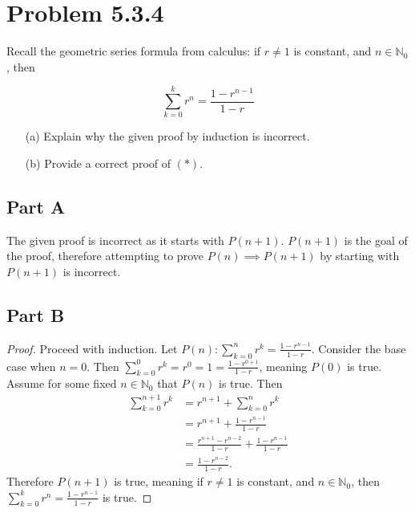 \documentclass[12pt]{extarticle}
\begin{document}
\section*{Problem 5.3.4}

Recall the geometric series formula from calculus: if $r \neq 1$ is constant, and $n \in \mathbb{N}_0$, then

\begin{equation*}
	\sum_{k=0}^k r^n = \frac{1-r^{n-1}}{1 - r} \tag{$*$}
\end{equation*}

\begin{enumerate}
	\item[(a)] Explain why the given proof by induction is incorrect.	
	\item[(b)] Provide a correct proof of $(*)$.
\end{enumerate}

\subsection*{Part A}

The given proof is incorrect as it starts with $P(n+1)$. $P(n+1)$ is the goal of the proof, therefore attempting to prove $P(n) \implies P(n+1)$ by starting with $P(n+1)$ is incorrect.

\subsection*{Part B}

\begin{proof}
	Proceed with induction. Let $P(n): \displaystyle\sum_{k=0}^n r^k = \frac{1-r^{n-1}}{1 - r}$. Consider the base case when $n = 0$. Then $\displaystyle\sum_{k=0}^0 r^k = r^0 = 1 = \frac{1 - r^{0+1}}{1 - r}$, meaning $P(0)$ is true. Assume for some fixed $n \in \mathbb{N}_0$ that $P(n)$ is true. Then
	\begin{align*}
		\sum_{k=0}^{n+1} r^k &= r^{n+1} + \sum_{k=0}^{n} r^k \\
												 &= r^{n+1} + \frac{1-r^{n-1}}{1-r} \\
												 &= \frac{r^{n+1} - r^{n-2}}{1-r} + \frac{1-r^{n-1}}{1-r} \\
												 &= \frac{1 - r^{n-2}}{1-r}
	.\end{align*}
	Therefore $P(n+1)$ is true, meaning if $r \neq 1$ is constant, and $n \in \mathbb{N}_0$, then $\displaystyle \sum_{k=0}^k r^n = \frac{1-r^{n-1}}{1 - r}$ is true.
\end{proof}
\end{document}
